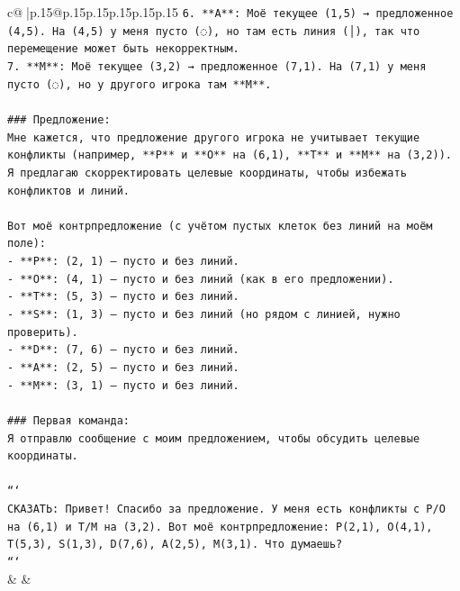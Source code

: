 \documentclass{article}
\begin{document}
{\begin{supertabular}{c@{$\;$}|p{.15\linewidth}@{}p{.15\linewidth}p{.15\linewidth}p{.15\linewidth}p{.15\linewidth}p{.15\linewidth}}
{{{\texttt{6. **A**: Моё текущее (1,5) → предложенное (4,5). На (4,5) у меня пусто (◌), но там есть линия (│), так что перемещение может быть некорректным.} \\
\texttt{7. **M**: Моё текущее (3,2) → предложенное (7,1). На (7,1) у меня пусто (◌), но у другого игрока там **M**.} \\
\\ 
\texttt{\#\#\# Предложение:} \\
\texttt{Мне кажется, что предложение другого игрока не учитывает текущие конфликты (например, **P** и **O** на (6,1), **T** и **M** на (3,2)). Я предлагаю скорректировать целевые координаты, чтобы избежать конфликтов и линий.} \\
\\ 
\texttt{Вот моё контрпредложение (с учётом пустых клеток без линий на моём поле):} \\
\texttt{{-} **P**: (2, 1) — пусто и без линий.} \\
\texttt{{-} **O**: (4, 1) — пусто и без линий (как в его предложении).} \\
\texttt{{-} **T**: (5, 3) — пусто и без линий.} \\
\texttt{{-} **S**: (1, 3) — пусто и без линий (но рядом с линией, нужно проверить).} \\
\texttt{{-} **D**: (7, 6) — пусто и без линий.} \\
\texttt{{-} **A**: (2, 5) — пусто и без линий.} \\
\texttt{{-} **M**: (3, 1) — пусто и без линий.} \\
\\ 
\texttt{\#\#\# Первая команда:} \\
\texttt{Я отправлю сообщение с моим предложением, чтобы обсудить целевые координаты.} \\
\\ 
\texttt{```} \\
\texttt{СКАЗАТЬ: Привет! Спасибо за предложение. У меня есть конфликты с P/O на (6,1) и T/M на (3,2). Вот моё контрпредложение: P(2,1), O(4,1), T(5,3), S(1,3), D(7,6), A(2,5), M(3,1). Что думаешь?} \\
\texttt{```} \\
            }
        }
    }
    & & \\ \\


\end{supertabular}}
\end{document}
